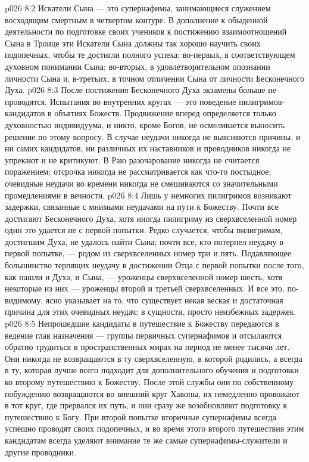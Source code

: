\vs p026 8:2 Искатели Сына --- это супернафимы, занимающиеся служением восходящим смертным в четвертом контуре. В дополнение к обыденной деятельности по подготовке своих учеников к постижению взаимоотношений Сына в Троице эти Искатели Сына должны так хорошо научить своих подопечных, чтобы те достигли полного успеха: во\hyp{}первых, в соответствующем духовном понимании Сына; во\hyp{}вторых, в удовлетворительном опознании личности Сына и, в\hyp{}третьих, в точном отличении Сына от личности Бесконечного Духа.
\vs p026 8:3 После постижения Бесконечного Духа экзамены больше не проводятся. Испытания во внутренних кругах --- это поведение пилигримов\hyp{}кандидатов в объятиях Божеств. Продвижение вперед определяется только духовностью индивидуума, и никто, кроме Богов, не осмеливается выносить решение по этому вопросу. В случае неудачи никогда не выясняются причины, и ни самих кандидатов, ни различных их наставников и проводников никогда не упрекают и не критикуют. В Раю разочарование никогда не считается поражением; отсрочка никогда не рассматривается как что\hyp{}то постыдное; очевидные неудачи во времени никогда не смешиваются со значительными промедлениями в вечности.
\vs p026 8:4 \pc Лишь у немногих пилигримов возникают задержки, связанные с мнимыми неудачами на пути к Божеству. Почти все достигают Бесконечного Духа, хотя иногда пилигриму из сверхвселенной номер один это удается не с первой попытки. Редко случается, чтобы пилигримам, достигшим Духа, не удалось найти Сына; почти все, кто потерпел неудачу в первой попытке, --- родом из сверхвселенных номер три и пять. Подавляющее большинство терпящих неудачу в достижении Отца с первой попытки после того, как нашли и Духа, и Сына, --- уроженцы сверхвселенной номер шесть, хотя некоторые из них --- уроженцы второй и третьей сверхвселенных. И все это, по\hyp{}видимому, ясно указывает на то, что существует некая веская и достаточная причина для этих очевидных неудач; в сущности, просто неизбежных задержек.
\vs p026 8:5 Непрошедшие кандидаты в путешествие к Божеству передаются в ведение глав назначения --- группы первичных супернафимов и отсылаются обратно трудиться в пространственных мирах на период не менее тысячи лет. Они никогда не возвращаются в ту сверхвселенную, в которой родились, а всегда в ту, которая лучше всего подходит для дополнительного обучения и подготовки ко второму путешествию к Божеству. После этой службы они по собственному побуждению возвращаются во внешний круг Хавоны, их немедленно провожают в тот круг, где прервался их путь, и они сразу же возобновляют подготовку к путешествию к Богу. При второй попытке вторичные супернафимы всегда успешно проводят своих подопечных, и во время этого второго путешествия этим кандидатам всегда уделяют внимание те же самые супернафимы\hyp{}служители и другие проводники.
